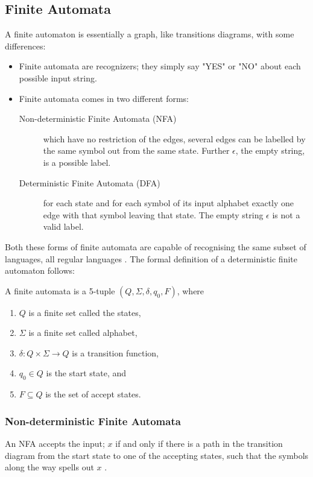 \subsection{Finite Automata}
A finite automaton is essentially a graph, like transitions diagrams, with some 
differences:
\begin{itemize}
  \item Finite automata are recognizers; they simply say "YES" or "NO" about 
each possible input string.
  \item Finite automata comes in two different forms:
    \begin{description}
      \item [Non-deterministic Finite Automata (NFA)] which have no restriction 
of the edges, several edges can be labelled by the same symbol out from the 
same state. Further $\epsilon$, the empty string, is a possible label. 
      \item [Deterministic Finite Automata (DFA)] for each state and for each 
symbol of its input alphabet exactly one edge with that symbol leaving that 
state. The empty string $\epsilon$ is not a valid label.
    \end{description}
\end{itemize}
Both these forms of finite automata are capable of recognising the same 
subset of languages, all regular languages \cite{Aho2006}.
The formal definition of a deterministic finite automaton follows:
\begin{definition} \label{finiteAutomataDef}
A finite automata is a 5-tuple $(Q, \Sigma, \delta, q_0, F)$, where
\begin{enumerate}
  \item $Q$ is a finite set called the states,
  \item $\Sigma$ is a finite set called alphabet,
  \item $\delta: Q \times \Sigma \to Q$ is a transition function,
  \item $q_0 \in Q$ is the start state, and
  \item $F \subseteq Q$ is the set of accept states.
\end{enumerate}

\end{definition}
\subsubsection{Non-deterministic Finite Automata}
An NFA accepts the input; $x$ if and only if there is a path in the transition 
diagram from the start state to one of the accepting states, such that the 
symbols along the way spells out $x$ \cite{Aho2006}.

